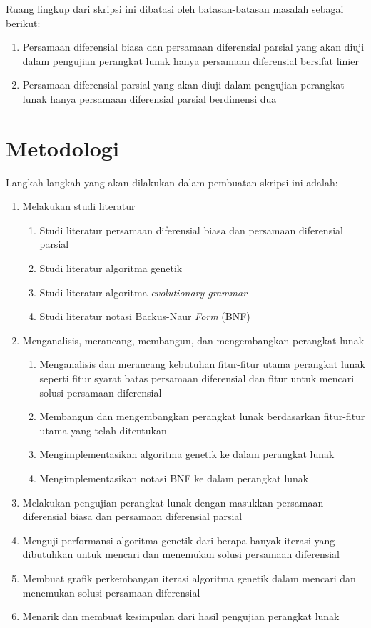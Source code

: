Ruang lingkup dari skripsi ini dibatasi oleh batasan-batasan masalah sebagai berikut:

\begin{enumerate}
 	\item Persamaan diferensial biasa dan persamaan diferensial parsial yang akan diuji dalam pengujian perangkat lunak hanya persamaan diferensial bersifat linier
	\item Persamaan diferensial parsial yang akan diuji dalam pengujian perangkat lunak hanya persamaan diferensial parsial berdimensi dua
\end{enumerate}


\section{Metodologi}
\label{sec:metlit}

Langkah-langkah yang akan dilakukan dalam pembuatan skripsi ini adalah:

\begin{enumerate}
	\item Melakukan studi literatur
		\begin{enumerate}
			\item Studi literatur persamaan diferensial biasa dan persamaan diferensial parsial
			\item Studi literatur algoritma genetik
			\item Studi literatur algoritma \textit{evolutionary grammar}
			\item Studi literatur notasi Backus-Naur \textit{Form} (BNF)
		\end{enumerate}
	\item Menganalisis, merancang, membangun, dan mengembangkan perangkat lunak
		\begin{enumerate}
			\item Menganalisis dan merancang kebutuhan fitur-fitur utama perangkat lunak seperti fitur syarat batas persamaan diferensial dan fitur untuk mencari solusi persamaan diferensial
			\item Membangun dan mengembangkan perangkat lunak berdasarkan fitur-fitur utama yang telah ditentukan
			\item Mengimplementasikan algoritma genetik ke dalam perangkat lunak
			\item Mengimplementasikan notasi BNF ke dalam perangkat lunak
		\end{enumerate}
	\item Melakukan pengujian perangkat lunak dengan masukkan persamaan diferensial biasa dan persamaan diferensial parsial
			\item Menguji performansi algoritma genetik dari berapa banyak iterasi yang dibutuhkan untuk mencari dan menemukan solusi persamaan diferensial
			\item Membuat grafik perkembangan iterasi algoritma genetik dalam mencari dan menemukan solusi persamaan diferensial
	\item Menarik dan membuat kesimpulan dari hasil pengujian perangkat lunak
\end{enumerate}

